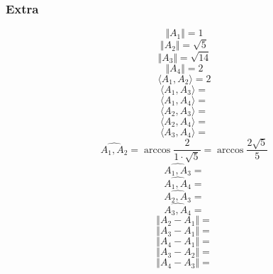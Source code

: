 \documentclass[lineaire_algebra_oplossingen.tex]{subfiles}
\begin{document}
\subsubsection*{Extra}
\[
\Vert A_1 \Vert 
= 1
\]
\[
\Vert A_2 \Vert 
= \sqrt{5}
\]
\[
\Vert A_3 \Vert
= \sqrt{14}
\]
\[
\Vert A_4 \Vert
= 2
\]
\[
\langle A_1,A_2 \rangle
= 2
\]
\[
\langle A_1,A_3 \rangle
=
\]
\[
\langle A_1,A_4 \rangle
=
\]
\[
\langle A_2,A_3 \rangle
=
\]
\[
\langle A_2,A_4 \rangle
=
\]
\[
\langle A_3,A_4 \rangle
=
\]
\[
\widehat{A_1,A_2}
= \arccos\frac{2}{1\cdot \sqrt{5}}
= \arccos\frac{2\sqrt{5}}{5}
\]
\[
\widehat{A_1,A_3}
=
\]
\[
\widehat{A_1,A_4}
=
\]
\[
\widehat{A_2,A_3}
=
\]
\[
\widehat{A_3,A_4}
=
\]
\[
\Vert A_2-A_1 \Vert
=
\]
\[
\Vert A_3-A_1 \Vert
=
\]
\[
\Vert A_4-A_1 \Vert
=
\]
\[
\Vert A_3-A_2 \Vert
=
\]
\[
\Vert A_4-A_3 \Vert
=
\]
\end{document}

